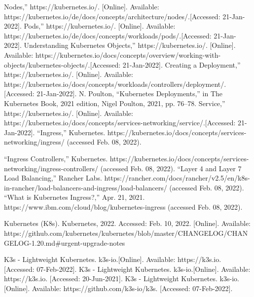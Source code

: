 \documentclass[12pt,oneside]{report}
\begin{document}
\begin{thebibliography}{10}
     Nodes,” https://kubernetes.io/. [Online]. 
    Available: https://kubernetes.io/de/docs/concepts/architecture/nodes/.[Accessed: 21-Jan-2022].
     Pods,” https://kubernetes.io/. [Online]. 
    Available: https://kubernetes.io/de/docs/concepts/workloads/pods/.[Accessed: 21-Jan-2022].
     Understanding Kubernetes Objects,” https://kubernetes.io/. [Online]. 
    Available: https://kubernetes.io/docs/concepts/overview/working-with-objects/kubernetes-objects/.[Accessed: 21-Jan-2022].  
     Creating a Deployment,” https://kubernetes.io/. [Online]. 
    Available: https://kubernetes.io/docs/concepts/workloads/controllers/deployment/.[Accessed: 21-Jan-2022].
     N. Poulton, “Kubernetes Deployments,” in The Kubernetes Book, 2021 edition, Nigel Poulton, 2021, pp. 76–78. 
     Service,” https://kubernetes.io/. [Online]. 
    Available: https://kubernetes.io/docs/concepts/services-networking/service/.[Accessed: 21-Jan-2022].
    “Ingress,” Kubernetes. https://kubernetes.io/docs/concepts/services-networking/ingress/ (accessed Feb. 08, 2022).

    “Ingress Controllers,” Kubernetes. https://kubernetes.io/docs/concepts/services-networking/ingress-controllers/ (accessed Feb. 08, 2022).
    “Layer 4 and Layer 7 Load Balancing,” Rancher Labs. https://rancher.com/docs/rancher/v2.5/en/k8s-in-rancher/load-balancers-and-ingress/load-balancers/ (accessed Feb. 08, 2022).
    “What is Kubernetes Ingress?,” Apr. 21, 2021. https://www.ibm.com/cloud/blog/kubernetes-ingress (accessed Feb. 08, 2022).


     Kubernetes (K8s). Kubernetes, 2022. Accessed: Feb. 10, 2022. [Online]. Available: https://github.com/kubernetes/kubernetes/blob/master/CHANGELOG/CHANGELOG-1.20.md\#urgent-upgrade-notes




     K3s - Lightweight Kubernetes. k3s-io.[Online]. Available: https://k3s.io. [Accessed: 07-Feb-2022].
     K3s - Lightweight Kubernetes. k3s-io.[Online]. Available: https://k3s.io. [Accessed: 20-Jun-2021].
     K3s - Lightweight Kubernetes. k3s-io.[Online]. Available: https://github.com/k3s-io/k3s. [Accessed: 07-Feb-2022].


\end{thebibliography}
\end{document}
